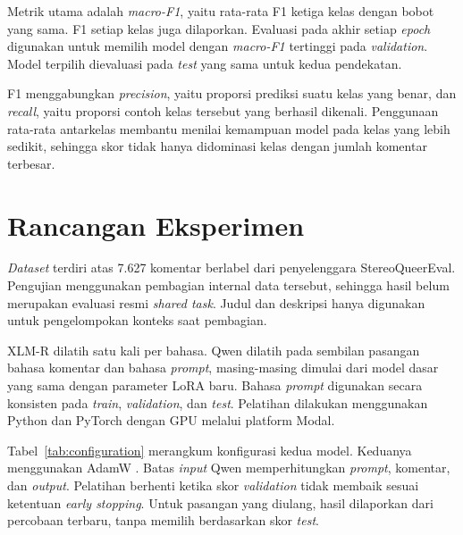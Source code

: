 \documentclass[11pt]{article}
\begin{document}
Metrik utama adalah \textit{macro-F1}, yaitu rata-rata F1 ketiga kelas dengan bobot yang sama. F1 setiap kelas juga dilaporkan. Evaluasi pada akhir setiap \textit{epoch} digunakan untuk memilih model dengan \textit{macro-F1} tertinggi pada \textit{validation}. Model terpilih dievaluasi pada \textit{test} yang sama untuk kedua pendekatan.

F1 menggabungkan \textit{precision}, yaitu proporsi prediksi suatu kelas yang benar, dan \textit{recall}, yaitu proporsi contoh kelas tersebut yang berhasil dikenali. Penggunaan rata-rata antarkelas membantu menilai kemampuan model pada kelas yang lebih sedikit, sehingga skor tidak hanya didominasi kelas dengan jumlah komentar terbesar.

\section{Rancangan Eksperimen}
\textit{Dataset} terdiri atas 7.627 komentar berlabel dari penyelenggara StereoQueerEval. Pengujian menggunakan pembagian internal data tersebut, sehingga hasil belum merupakan evaluasi resmi \textit{shared task}. Judul dan deskripsi hanya digunakan untuk pengelompokan konteks saat pembagian.

XLM-R dilatih satu kali per bahasa. Qwen dilatih pada sembilan pasangan bahasa komentar dan bahasa \textit{prompt}, masing-masing dimulai dari model dasar yang sama dengan parameter LoRA baru. Bahasa \textit{prompt} digunakan secara konsisten pada \textit{train}, \textit{validation}, dan \textit{test}. Pelatihan dilakukan menggunakan Python dan PyTorch dengan GPU melalui platform Modal.

Tabel~\ref{tab:configuration} merangkum konfigurasi kedua model. Keduanya menggunakan AdamW \citep{loshchilov-hutter-2019-decoupled}. Batas \textit{input} Qwen memperhitungkan \textit{prompt}, komentar, dan \textit{output}. Pelatihan berhenti ketika skor \textit{validation} tidak membaik sesuai ketentuan \textit{early stopping}. Untuk pasangan yang diulang, hasil dilaporkan dari percobaan terbaru, tanpa memilih berdasarkan skor \textit{test}.
\end{document}
